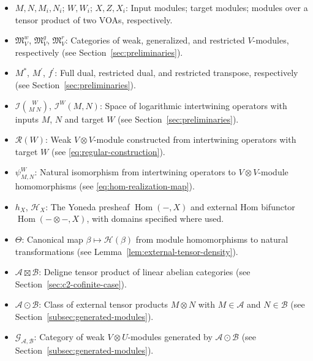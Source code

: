 \documentclass[12pt, english]{article}
\numberwithin{equation}{section}
\DeclareMathOperator{\Hom}{Hom}
\theoremstyle{plain}
\theoremstyle{definition}
\theoremstyle{remark}
\begin{document}
	\begin{itemize}
		\item $M, N, M_i, N_i$; $W, W_i$; $X, Z, X_i$: Input modules; target modules; modules over a tensor product of two VOAs, respectively.
		
		\item $\mathfrak{M}^w_V$, $\mathfrak{M}^g_V$, $\mathfrak{M}^r_V$: Categories of weak, generalized, and restricted $V$-modules, respectively (see Section~\ref{sec:preliminaries}).
		
		\item $M^*$, $M^\prime$, $f^\prime$: Full dual, restricted dual, and restricted transpose, respectively (see Section~\ref{sec:preliminaries}).
		
		\item $\mathcal{I}\binom{W}{M\;N}$, $\mathcal{I}^{W}(M, N)$: Space of logarithmic intertwining operators with inputs $M$, $N$ and target $W$ (see Section~\ref{sec:preliminaries}).
		
		\item $\mathcal{R}(W)$: Weak $V\otimes V$-module constructed from intertwining operators with target $W$ (see \eqref{eq:regular-construction}).
		
		\item $\psi^{W}_{M, N}$: Natural isomorphism from intertwining operators to $V\otimes V$-module homomorphisms (see \eqref{eq:hom-realization-map}).
		
		\item $h_X$, $\mathcal{H}_X$: The Yoneda presheaf $\Hom(-,X)$ and external Hom bifunctor $\Hom(-\otimes-,X)$, with domains specified where used.
		
		\item $\Theta$: Canonical map $\beta \mapsto \mathcal{H}(\beta)$ from module homomorphisms to natural transformations (see Lemma~\ref{lem:external-tensor-density}).
		
		\item $\mathcal{A}\boxtimes\mathcal{B}$: Deligne tensor product of linear abelian categories (see Section~\ref{sec:c2-cofinite-case}).
		
		\item $\mathcal{A}\odot\mathcal{B}$: Class of external tensor products $M\otimes N$ with $M\in\mathcal{A}$ and $N\in\mathcal{B}$ (see Section~\ref{subsec:generated-modules}).
		
		\item $\mathcal{G}_{\mathcal{A}, \mathcal{B}}$: Category of weak $V\otimes U$-modules generated by $\mathcal{A}\odot\mathcal{B}$ (see Section~\ref{subsec:generated-modules}).
		

\end{itemize}
\end{document}
